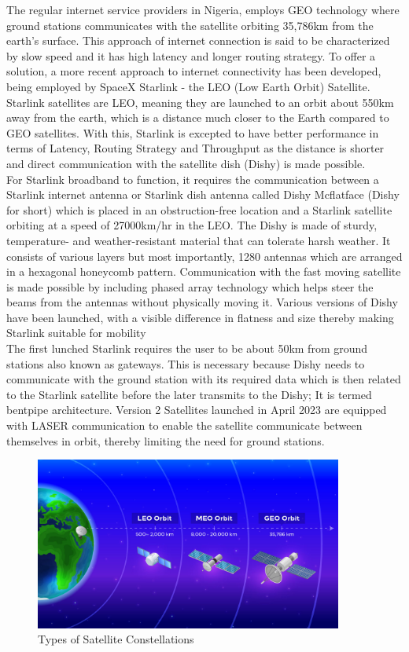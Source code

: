 	The regular internet service providers in Nigeria, employs GEO technology where ground stations communicates with the satellite orbiting 35,786km from the earth's surface. This approach of internet connection is said to be characterized by slow speed and it has high latency and longer routing strategy.
	To offer a solution, a more recent approach to internet connectivity has been developed, being employed by SpaceX Starlink - the LEO (Low Earth Orbit) Satellite.
	Starlink satellites are LEO, meaning they are launched to an orbit about 550km away from the earth, which is a distance much closer to the Earth compared to GEO satellites. With this, Starlink is excepted to have better performance in terms of Latency, Routing Strategy and Throughput as the distance is shorter and direct communication with the satellite dish (Dishy) is made possible.\\
	For Starlink broadband to function, it requires the communication between a Starlink internet antenna or Starlink dish antenna called Dishy Mcflatface (Dishy for short) which is placed in an obstruction-free location and a Starlink satellite orbiting at a speed of 27000km/hr in the LEO.
	The Dishy is made of sturdy, temperature- and weather-resistant material that can tolerate harsh weather. It consists of various layers but most importantly, 1280 antennas which are arranged in a hexagonal honeycomb pattern. Communication with the fast moving satellite is made possible by including phased array technology which helps steer the beams from the antennas without physically moving it. Various versions of Dishy have been launched, with a visible difference in flatness and size thereby making Starlink suitable for mobility\\
	The first lunched Starlink requires the user to be about 50km from ground stations also known as gateways. This  is necessary because Dishy needs to communicate with the ground station with its required data which is then related to the Starlink satellite before the later transmits to the Dishy; It is termed bentpipe architecture. Version 2 Satellites launched in April 2023 are equipped with LASER communication to enable the satellite communicate between themselves in orbit, thereby limiting the need for ground stations.
	
\begin{figure}[H]
\centering
\includegraphics[width=0.9\textwidth]{space orbits}
\caption{Types of Satellite Constellations}
\end{figure}

